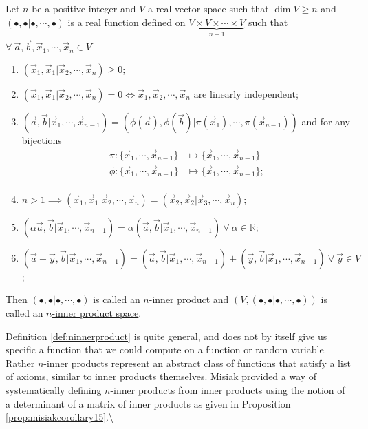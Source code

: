 \documentclass[
  letterpaper,
  DIV=11,
  numbers=noendperiod]{scrreprt}
\begin{document}
\begin{Definition}[mydefinition=$n$-Inner Product \cite{Misiak1989}, label=def:ninnerproduct]
Let $n$ be a positive integer and $V$ a real vector space such that $\dim V \geq n$ and $( \bullet, \bullet | \bullet, \cdots, \bullet )$ is a real function defined on $\underbrace{V \times V \times  \cdots \times V}_{n+1}$ such that\\ $ \forall\ \vec{a}, \vec{b}, \vec{x}_1, \cdots, \vec{x}_{n} \in V$

\begin{enumerate}
    \item $(\vec{x}_1, \vec{x}_1 | \vec{x}_2, \cdots, \vec{x}_n) \geq 0$;
    \item $(\vec{x}_1, \vec{x}_1 | \vec{x}_2, \cdots, \vec{x}_n) = 0 \iff \vec{x}_1, \vec{x}_2, \cdots, \vec{x}_n$ are linearly independent;
    \item $(\vec{a}, \vec{b} | \vec{x}_1, \cdots, \vec{x}_{n-1}) = (\phi(\vec{a}), \phi (\vec{b}) | \pi(\vec{x}_1), \cdots, \pi(\vec{x}_{n-1}))$ and for any bijections
    \begin{align*}
        \pi : \{ \vec{x}_1, \cdots, \vec{x}_{n-1}  \} &\mapsto \{ \vec{x}_1, \cdots, \vec{x}_{n-1}  \}\\
        \phi:  \{ \vec{x}_1, \cdots, \vec{x}_{n-1}  \} &\mapsto \{ \vec{x}_1, \cdots, \vec{x}_{n-1} \}; \\
    \end{align*}
    \item $n > 1 \implies (\vec{x}_1, \vec{x}_1 | \vec{x}_2, \cdots, \vec{x}_n) = (\vec{x}_2, \vec{x}_2 | \vec{x}_3, \cdots, \vec{x}_n)$;
    \item $(\alpha \vec{a}, \vec{b} | \vec{x}_1, \cdots, \vec{x}_{n-1})=  \alpha (\vec{a}, \vec{b} | \vec{x}_1, \cdots, \vec{x}_{n-1})\ \forall\  \alpha \in \mathbb{R}$;
    \item $ (\vec{a} + \vec{y}, \vec{b} | \vec{x}_1, \cdots, \vec{x}_{n-1}) =  (\vec{a}, \vec{b} | \vec{x}_1, \cdots, \vec{x}_{n-1}) + (\vec{y}, \vec{b} | \vec{x}_1, \cdots, \vec{x}_{n-1})\ \forall\ \vec{y} \in V$;
\end{enumerate}

Then $( \bullet, \bullet | \bullet, \cdots, \bullet )$ is called an \underline{$n$-inner product} and $(V, ( \bullet, \bullet | \bullet, \cdots, \bullet ))$ is called an \underline{$n$-inner product space}.
\end{Definition}

Definition \ref{def:ninnerproduct} is quite general, and does not by
itself give us specific a function that we could compute on a function
or random variable. Rather \(n\)-inner products represent an abstract
class of functions that satisfy a list of axioms, similar to inner
products themselves. Misiak provided a way of systematically defining
\(n\)-inner products from inner products using the notion of a
determinant of a matrix of inner products as given in Proposition
\ref{prop:misiakcorollary15}.\textbackslash{}
\end{document}
